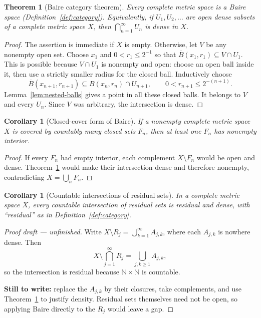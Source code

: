 \documentclass[11pt,a4paper]{article}
\theoremstyle{definition}
\theoremstyle{plain}
\newtheorem{theorem}[definition]{Theorem}
\newtheorem{corollary}[definition]{Corollary}
\newcommand{\N}{\mathbb{N}}
\begin{document}
\begin{theorem}[Baire category theorem]\label{thm:baire}
Every complete metric space is a Baire space
(Definition~\ref{def:category}). Equivalently, if $U_1,U_2,\ldots$ are
open dense subsets of a complete metric space $X$, then
$\bigcap_{n=1}^{\infty}U_n$ is dense in $X$.
\end{theorem}
\begin{proof}
The assertion is immediate if $X$ is empty. Otherwise, let $V$ be any
nonempty open set. Choose $x_1$ and $0<r_1\le2^{-1}$ so that
$\overline B(x_1,r_1)\subseteq V\cap U_1$.
This is possible because $V\cap U_1$ is nonempty and open: choose an
open ball inside it, then use a strictly smaller radius for the closed ball.
Inductively choose
\[
 \overline B(x_{n+1},r_{n+1})
 \subseteq B(x_n,r_n)\cap U_{n+1},\qquad
 0<r_{n+1}\le2^{-(n+1)}.
\]
Lemma~\ref{lem:nested-balls} gives a point in all these closed balls.
It belongs to $V$ and every $U_n$. Since $V$ was arbitrary, the intersection
is dense.
\end{proof}

\begin{corollary}[Closed-cover form of Baire]\label{cor:closed-cover}
If a nonempty complete metric space $X$ is covered by countably many closed
sets $F_n$, then at least one $F_n$ has nonempty interior.
\end{corollary}
\begin{proof}
If every $F_n$ had empty interior, each complement $X\setminus F_n$
would be open and dense. Theorem~\ref{thm:baire} would make their
intersection dense and therefore nonempty, contradicting $X=\bigcup_nF_n$.
\end{proof}

\begin{corollary}[Countable intersections of residual sets]\label{cor:residual}
In a complete metric space $X$, every countable intersection of residual
sets is residual and dense, with ``residual'' as in
Definition~\ref{def:category}.
\end{corollary}
\begin{proof}[Proof draft --- unfinished]
Write $X\setminus R_j=\bigcup_{k=1}^{\infty}A_{j,k}$, where each
$A_{j,k}$ is nowhere dense. Then
\[
 X\setminus\bigcap_{j=1}^{\infty}R_j
   =\bigcup_{j,k\ge1}A_{j,k},
\]
so the intersection is residual because $\N\times\N$ is countable.

\textbf{Still to write:} replace the $A_{j,k}$ by their closures, take
complements, and use Theorem~\ref{thm:baire} to justify density.
Residual sets themselves need not be open, so applying Baire directly
to the $R_j$ would leave a gap.
\renewcommand{\qedsymbol}{}
\end{proof}
\end{document}
